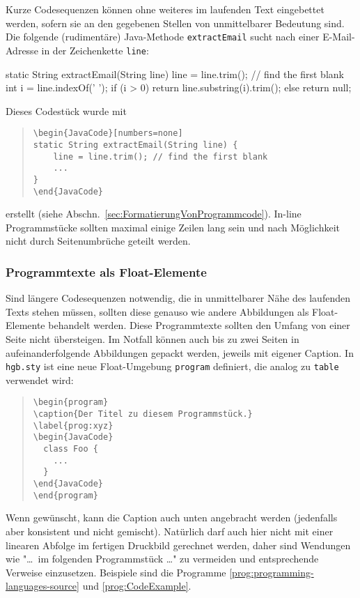 Kurze Codesequenzen können ohne weiteres im laufenden Text eingebettet
werden, sofern sie an den gegebenen Stellen von unmittelbarer Bedeutung sind.
Die folgende (rudimentäre) Java-Methode \texttt{extractEmail} sucht nach
einer E-Mail-Adresse in der Zeichenkette \texttt{line}:
%
\begin{JavaCode}[numbers=none]
static String extractEmail(String line) {
    line = line.trim(); // find the first blank
    int i = line.indexOf(' '); 
    if (i > 0)
        return line.substring(i).trim();
    else
        return null;
}
\end{JavaCode}
%
\noindent
Dieses Codestück wurde mit 
%
\begin{quote}
\begin{verbatim}
\begin{JavaCode}[numbers=none]
static String extractEmail(String line) {
    line = line.trim(); // find the first blank
    ...
}
\end{JavaCode}
\end{verbatim}
\end{quote}
%
erstellt (siehe Abschn.\ \ref{sec:FormatierungVonProgrammcode}). In-line
Programmstücke sollten maximal einige Zeilen lang sein und nach Möglichkeit
nicht durch Seitenumbrüche geteilt werden.


\subsubsection{Programmtexte als Float-Elemente}

Sind längere Codesequenzen notwendig, die in unmittelbarer Nähe des laufenden
Texts stehen müssen, sollten diese genauso wie andere Abbildungen als
Float-Elemente behandelt werden. Diese Programmtexte sollten den Umfang von
einer Seite nicht übersteigen. Im Notfall können auch bis zu zwei Seiten in
aufeinanderfolgende Abbildungen gepackt werden, jeweils mit eigener Caption.
In \texttt{hgb.sty} ist eine neue Float-Umgebung \texttt{program} definiert,
die analog zu \texttt{table} verwendet wird:
%
\begin{quote}
\begin{verbatim}
\begin{program}
\caption{Der Titel zu diesem Programmstück.}
\label{prog:xyz}
\begin{JavaCode}
  class Foo {
    ...
  }
\end{JavaCode}
\end{program}
\end{verbatim}
\end{quote}
%
Wenn gewünscht, kann die Caption auch unten angebracht werden (jedenfalls
aber konsistent und nicht gemischt). Natürlich darf auch hier nicht mit einer
linearen Abfolge im fertigen Druckbild gerechnet werden, daher sind Wendungen
wie "\ldots\ im folgenden Programmstück \ldots" zu vermeiden und
entsprechende Verweise einzusetzen. Beispiele sind die Programme
\ref{prog:programming-languages-source} und \ref{prog:CodeExample}.

